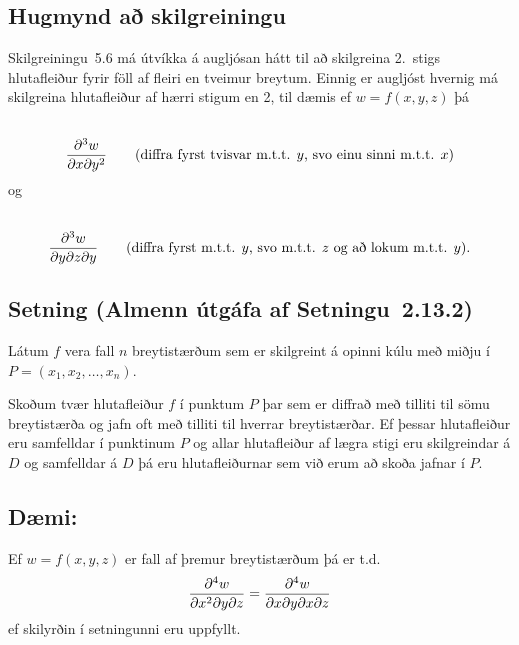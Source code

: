 \documentclass[a4paper,10pt,icelandic]{sphinxmanual}
\begin{document}
\subsection{Hugmynd að skilgreiningu}
\label{Kafli2:hugmynd-a-skilgreiningu}
Skilgreiningu 5.6 má útvíkka á augljósan hátt til að skilgreina 2. stigs
hlutafleiður fyrir föll af fleiri en tveimur breytum. Einnig er augljóst
hvernig má skilgreina hlutafleiður af hærri stigum en 2, til dæmis ef
\(w=f(x,y,z)\) þá
\begin{gather}
\begin{split}\displaystyle\end{split}\notag\\\begin{split}\frac{\partial^3 w}{\partial x\partial y^2} \quad\quad\mbox{(diffra
    fyrst tvisvar m.t.t. }y\mbox{, svo einu sinni m.t.t. } x\mbox{)}\end{split}\notag
\end{gather}
og
\begin{gather}
\begin{split}\displaystyle\end{split}\notag\\\begin{split}\frac{\partial^3 w}{\partial y\partial z\partial y} \quad\quad\mbox{(diffra
    fyrst m.t.t. } y\mbox{, svo m.t.t. } z
\mbox{ og að lokum m.t.t. }y\mbox{)}.\end{split}\notag
\end{gather}

\subsection{Setning (Almenn útgáfa af Setningu 2.13.2)}
\label{Kafli2:setning-almenn-utgafa-af-setningu-2-13-2}
Látum \(f\) vera fall \(n\) breytistærðum sem er skilgreint á
opinni kúlu með miðju í \(P=(x_1, x_2,\ldots, x_n)\).

Skoðum tvær hlutafleiður \(f\) í punktum \(P\) þar sem er
diffrað með tilliti til sömu breytistærða og jafn oft með tilliti til
hverrar breytistærðar. Ef þessar hlutafleiður eru samfelldar í punktinum
\(P\) og allar hlutafleiður af lægra stigi eru skilgreindar á
\(D\) og samfelldar á \(D\) þá eru hlutafleiðurnar sem við erum
að skoða jafnar í \(P\).


\subsection{Dæmi:}
\label{Kafli2:daemi}
Ef \(w = f(x,y,z)\) er fall af þremur breytistærðum þá er t.d.
\begin{gather}
\begin{split}\displaystyle \frac{\partial^4 w}{\partial x^2\partial y \partial z} = \frac{\partial^4 w}{\partial x \partial y \partial x \partial z}\end{split}\notag
\end{gather}
ef skilyrðin í setningunni eru uppfyllt.
\end{document}
